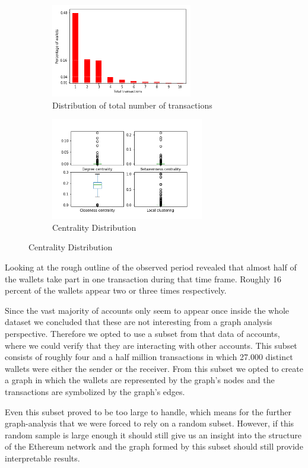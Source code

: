 \begin{figure}[t]
\caption{Network Overview}
\centering
\begin{subfigure}[b]{0.5\textwidth}
\centering
\includegraphics[height=155px]{../pics/distribution.png}
\caption{Distribution of total number of transactions}
\end{subfigure}%
\begin{subfigure}[b]{0.5\textwidth}
\centering
\includegraphics[height=168px]{../analysis/centrality.png}
\caption{Centrality Distribution}
\label{centralitydist}
\end{subfigure}
\end{figure}

Looking at the rough outline of the observed period revealed that almost half of the wallets take part in one transaction during that time frame.
Roughly 16 percent of the wallets appear two or three times respectively.

Since the vast majority of accounts only seem to appear once inside the whole dataset we concluded that these are not interesting from a graph analysis perspective. 
Therefore we opted to use a subset from that data of accounts, where we could verify that they are interacting with other accounts. 
This subset consists of roughly four and a half million transactions in which 27.000 distinct wallets were either the sender or the receiver. 
From this subset we opted to create a graph in which the wallets are represented by the graph's nodes and the transactions are symbolized by the graph's edges.

Even this subset proved to be too large to handle, which means for the further graph-analysis that we were forced to rely on a random subset. 
However, if this random sample is large enough it should still give us an insight into the structure of the Ethereum network and the graph formed by this subset should still provide interpretable results.

